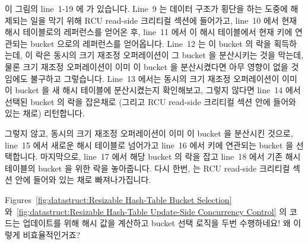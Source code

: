이 그림의 line~1-19 에  가 있습니다.
Line~9 는 데이터 구조가 횡단을 하는 도중에 해제되는 일을 막기 위해 RCU
read-side 크리티컬 섹션에 들어가고, line~10 에서 현재 해시 테이블로의
레퍼런스를 얻어온 후, line~11 에서 이 해시 테이블에서 현재 키에 연관되는 bucket
으로의 레퍼런스를 얻어옵니다.
Line~12 는 이 bucket 의 락을 획득하는데, 이 락은 동시의 크기 재조정
오퍼레이션이 그 bucket 을 분산시키는 것을 막는데, 물론 크기 재조정 오퍼레이션이
이미 이 bucket 을 분산시켰다면 아무 영향이 없을 것임에도 불구하고 그렇습니다.
Line~13 에서는 동시의 크기 재조정 오퍼레이션이 이미 이 bucket 을 새 해시
테이블에 분산시켰는지 확인해보고, 그렇지 않다면 line~14 에서 선택된 bucket 의
락을 잡은채로 (그리고 RCU read-side 크리티컬 섹션 안에 들어와 있는 채로)
리턴합니다.

그렇지 않고, 동시의 크기 재조정 오퍼레이션이 이미 이 bucket 을 분산시킨 것으로,
line~15 에서 새로운 해시 테이블로 넘어가고 line~16 에서 키에 연관되는 bucket 을
선택합니다.
마지막으로, line~17 에서 해당 bucket 의 락을 잡고 line~18 에서 기존 해시
테이블의 bucket 을 위한 락을 놓아줍니다.
다시 한번,  는 RCU read-side 크리티컬 섹션 안에 들어와
있는 채로 빠져나가집니다.

\QuickQuiz{}
	Figures~\ref{fig:datastruct:Resizable Hash-Table Bucket Selection}
	와~\ref{fig:datastruct:Resizable Hash-Table Update-Side Concurrency Control}
	의 코드는 업데이트를 위해 해시 값을 계산하고 bucket 선택 로직을 두번
	수행하네요!
	왜 이렇게 비효율적인거죠?
	\iffalse

